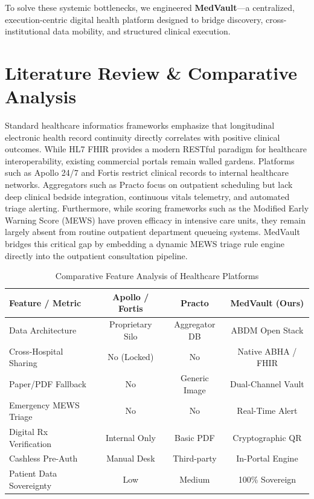 \documentclass[conference]{IEEEtran}
\begin{document}
To solve these systemic bottlenecks, we engineered \textbf{MedVault}---a centralized, execution-centric digital health platform designed to bridge discovery, cross-institutional data mobility, and structured clinical execution.

\section{Literature Review \& Comparative Analysis}
Standard healthcare informatics frameworks emphasize that longitudinal electronic health record continuity directly correlates with positive clinical outcomes. While HL7 FHIR provides a modern RESTful paradigm for healthcare interoperability, existing commercial portals remain walled gardens. Platforms such as Apollo 24/7 and Fortis restrict clinical records to internal healthcare networks. Aggregators such as Practo focus on outpatient scheduling but lack deep clinical bedside integration, continuous vitals telemetry, and automated triage alerting. Furthermore, while scoring frameworks such as the Modified Early Warning Score (MEWS) have proven efficacy in intensive care units, they remain largely absent from routine outpatient department queueing systems. MedVault bridges this critical gap by embedding a dynamic MEWS triage rule engine directly into the outpatient consultation pipeline.

\begin{table}[htbp]
\caption{Comparative Feature Analysis of Healthcare Platforms}
\begin{center}
\begin{tabular}{|l|c|c|c|}
\hline
\textbf{Feature / Metric} & \textbf{Apollo / Fortis} & \textbf{Practo} & \textbf{MedVault (Ours)} \\
\hline
Data Architecture & Proprietary Silo & Aggregator DB & ABDM Open Stack \\
Cross-Hospital Sharing & No (Locked) & No & Native ABHA / FHIR \\
Paper/PDF Fallback & No & Generic Image & Dual-Channel Vault \\
Emergency MEWS Triage & No & No & Real-Time Alert \\
Digital Rx Verification & Internal Only & Basic PDF & Cryptographic QR \\
Cashless Pre-Auth & Manual Desk & Third-party & In-Portal Engine \\
Patient Data Sovereignty & Low & Medium & 100\% Sovereign \\
\hline
\end{tabular}
\label{tab:comparative}
\end{center}
\end{table}
\end{document}
